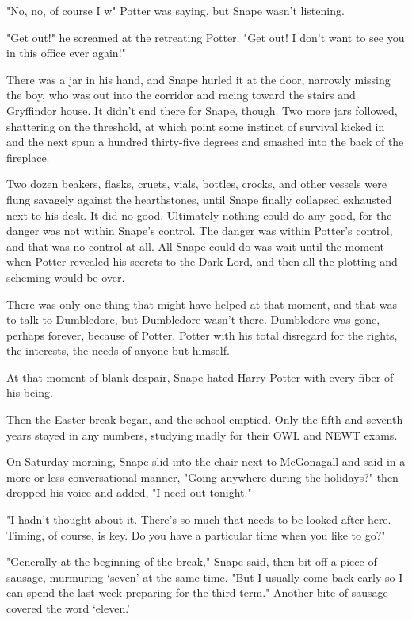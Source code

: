 "No, no, of course I w{\el}" Potter was saying, but Snape wasn't listening.

"Get out!" he screamed at the retreating Potter. "Get out! I don't want to see you in this office ever again!"

There was a jar in his hand, and Snape hurled it at the door, narrowly missing the boy, who was out into the corridor and racing toward the stairs and Gryffindor house. It didn't end there for Snape, though. Two more jars followed, shattering on the threshold, at which point some instinct of survival kicked in and the next spun a hundred thirty-five degrees and smashed into the back of the fireplace.

Two dozen beakers, flasks, cruets, vials, bottles, crocks, and other vessels were flung savagely against the hearthstones, until Snape finally collapsed exhausted next to his desk. It did no good. Ultimately nothing could do any good, for the danger was not within Snape's control. The danger was within Potter's control, and that was no control at all. All Snape could do was wait until the moment when Potter revealed his secrets to the Dark Lord, and then all the plotting and scheming would be over.

There was only one thing that might have helped at that moment, and that was to talk to Dumbledore, but Dumbledore wasn't there. Dumbledore was gone, perhaps forever, because of Potter. Potter with his total disregard for the rights, the interests, the needs of anyone but himself.

At that moment of blank despair, Snape hated Harry Potter with every fiber of his being.

Then the Easter break began, and the school emptied. Only the fifth and seventh years stayed in any numbers, studying madly for their OWL and NEWT exams.

On Saturday morning, Snape slid into the chair next to McGonagall and said in a more or less conversational manner, "Going anywhere during the holidays?" then dropped his voice and added, "I need out tonight."

"I hadn't thought about it. There's so much that needs to be looked after here. Timing, of course, is key. Do you have a particular time when you like to go?"

"Generally at the beginning of the break," Snape said, then bit off a piece of sausage, murmuring `seven' at the same time. "But I usually come back early so I can spend the last week preparing for the third term." Another bite of sausage covered the word `eleven.'

